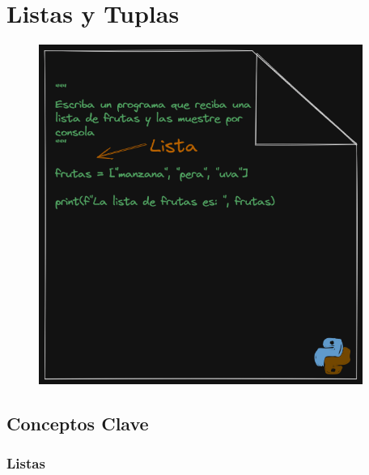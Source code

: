 \documentclass[
  a4paper,
  DIV=11,
  numbers=noendperiod,
  onepage,
  openany]{scrreprt}
\begin{document}
\chapter{Listas y Tuplas}\label{listas-y-tuplas}

\begin{figure}

{\centering \includegraphics[width=4.16667in,height=\textheight]{unidades/unidad3/images/list.png}

}

\end{figure}

\section{Conceptos Clave}\label{conceptos-clave-8}

\subsection{Listas}\label{listas}
\end{document}
